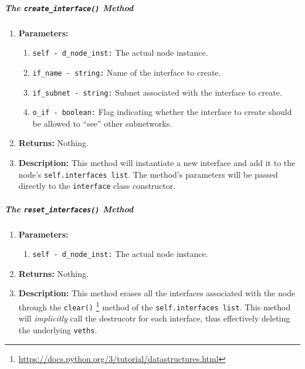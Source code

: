                     \subparagraph{The \texttt{create\_interface()} Method}
                        \begin{enumerate}
                            \item \textbf{Parameters:}
                            \begin{enumerate}
                                \item \texttt{self - d\_node\_inst:} The actual node instance.
                                \item \texttt{if\_name - string:} Name of the interface to create.
                                \item \texttt{if\_subnet - string:} Subnet associated with the interface to create.
                                \item \texttt{o\_if - boolean:} Flag indicating whether the interface to create should be allowed to ``see'' other subnetworks.
                            \end{enumerate}
                            \item \textbf{Returns:} Nothing.
                            \item \textbf{Description:} This method will instantiate a new interface and add it to the node's \texttt{self.interfaces list}. The method's parameters will be passed directly to the \texttt{interface} class constructor.
                        \end{enumerate}

                    \subparagraph{The \texttt{reset\_interfaces()} Method}
                        \begin{enumerate}
                            \item \textbf{Parameters:}
                            \begin{enumerate}
                                \item \texttt{self - d\_node\_inst:} The actual node instance.
                            \end{enumerate}
                            \item \textbf{Returns:} Nothing.
                            \item \textbf{Description:} This method erases all the interfaces associated with the node through the \texttt{clear()} \footnote{\href{https://docs.python.org/3/tutorial/datastructures.html}{https://docs.python.org/3/tutorial/datastructures.html}} method of the \texttt{self.interfaces list}. This method will \textit{implicitly} call the destrucotr for each interface, thus effectively deleting the underlying \texttt{veths}.
                        \end{enumerate}

